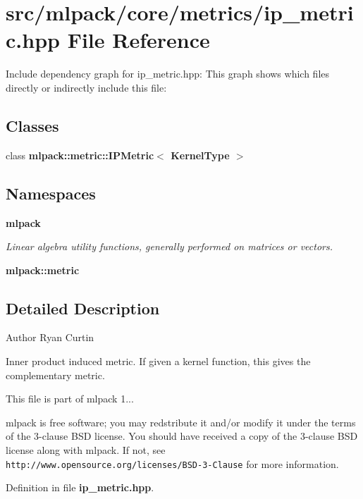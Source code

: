 \section{src/mlpack/core/metrics/ip\-\_\-metric.hpp File Reference}
\label{ip__metric_8hpp}
Include dependency graph for ip\-\_\-metric.\-hpp\-:
This graph shows which files directly or indirectly include this file\-:
\subsection*{Classes}
\begin{DoxyCompactItemize}
\item 
class {\bf mlpack\-::metric\-::\-I\-P\-Metric$<$ Kernel\-Type $>$}
\end{DoxyCompactItemize}
\subsection*{Namespaces}
\begin{DoxyCompactItemize}
\item 
{\bf mlpack}
\begin{DoxyCompactList}\small\item\em Linear algebra utility functions, generally performed on matrices or vectors. \end{DoxyCompactList}\item 
{\bf mlpack\-::metric}
\end{DoxyCompactItemize}


\subsection{Detailed Description}
\begin{DoxyAuthor}{Author}
Ryan Curtin
\end{DoxyAuthor}
Inner product induced metric. If given a kernel function, this gives the complementary metric.

This file is part of mlpack 1...

mlpack is free software; you may redstribute it and/or modify it under the terms of the 3-\/clause B\-S\-D license. You should have received a copy of the 3-\/clause B\-S\-D license along with mlpack. If not, see {\tt http\-://www.\-opensource.\-org/licenses/\-B\-S\-D-\/3-\/\-Clause} for more information. 

Definition in file {\bf ip\-\_\-metric.\-hpp}.

